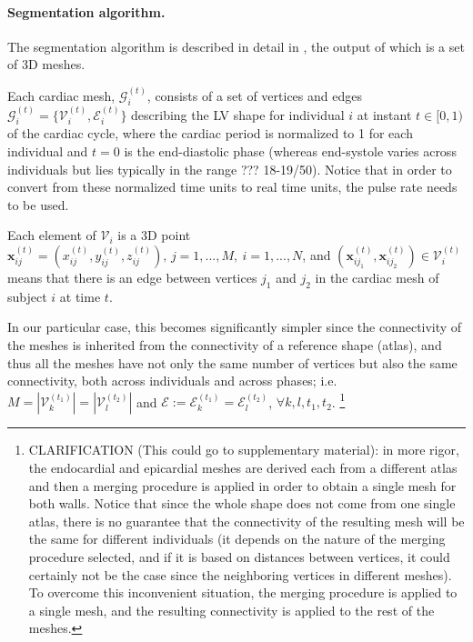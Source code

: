 \documentclass[twocolumn]{llncs}
\begin{document}
\paragraph{Segmentation algorithm.}
The segmentation algorithm is described in detail in \cite{ref_rahman}, the output of which is a set of 3D meshes. 

Each cardiac mesh, $\mathcal{G}_{i}^{(t)}$, consists of a set of vertices and edges $\mathcal{G}_{i}^{(t)}=\{\mathcal{V}_{i}^{(t)}, \mathcal{E}_{i}^{(t)}\}$ describing the LV shape for individual $i$ at instant $t\in[0,1)$ of the cardiac cycle, where the cardiac period is normalized to 1 for each individual and $t=0$ is the end-diastolic phase (whereas end-systole varies across individuals but lies typically in the range ??? 18-19/50). Notice that in order to convert from these normalized time units to real time units, the pulse rate needs to be used.

Each element of $\mathcal{V}_i$ is a 3D point $\textbf{x}_{ij}^{(t)}=(x_{ij}^{(t)}, y_{ij}^{(t)}, z_{ij}^{(t)}),\, j=1,...,M,\ i=1,...,N$, and $(\textbf{x}_{ij_1}^{(t)}, \textbf{x}_{ij_2}^{(t)})\in\mathcal{V}_i^{(t)}$ means that there is an edge between vertices $j_1$ and $j_2$ in the cardiac mesh of subject $i$ at time $t$.

In our particular case, this becomes significantly simpler since the connectivity of the meshes is inherited from the connectivity of a reference shape (atlas), and thus all the meshes have not only the same number of vertices but also the same connectivity, both across individuals and across phases; i.e. $M=|\mathcal{V}_k^{(t_1)}|=|\mathcal{V}_l^{(t_2)}|$ and $
\mathcal{E}:=\mathcal{E}_{k}^{(t_1)}=\mathcal{E}_{l}^{(t_2)}$, $\forall k, l, t_1, t_2$.
\footnote{CLARIFICATION (This could go to supplementary material): in more rigor, the endocardial and epicardial meshes are derived each from a different atlas and then a merging procedure is applied in order to obtain a single mesh for both walls. Notice that since the whole shape does not come from one single atlas, there is no guarantee that the connectivity of the resulting mesh will be the same for different individuals (it depends on the nature of the merging procedure selected, and if it is based on distances between vertices, it could certainly not be the case since the neighboring vertices in different meshes). To overcome this inconvenient situation, the merging procedure is applied to a single mesh, and the resulting connectivity is applied to the rest of the meshes.}
\end{document}
